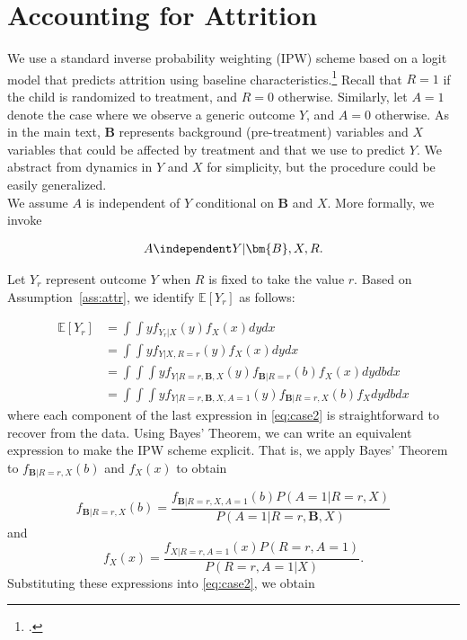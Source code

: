 \section{Accounting for Attrition} \label{appendix:attrition}

\noindent We use a standard inverse probability weighting (IPW) scheme based on a logit model that predicts attrition using baseline characteristics.\footnote{\citet{Horvitz_Thompson_1952_JASA}.} Recall that $R = 1$ if the child is randomized to treatment, and $R = 0$ otherwise. Similarly, let $A = 1$ denote the case where we observe a generic outcome $Y$, and $A = 0$ otherwise. As in the main text, $\bm{B}$ represents background (pre-treatment) variables and $X$ variables that could be affected by treatment and that we use to predict $Y$. We abstract from dynamics in $Y$ and $X$ for simplicity, but the procedure could be easily generalized.\\

\noindent We assume $A$ is independent of $Y$ conditional on $\bm{B}$ and $X$. More formally, we invoke


\begin{assumption} \label{ass:attr}
	\begin{align*}
		A \independent Y | \bm{B}, X, R.
	\end{align*}
\end{assumption}

\noindent Let $Y_{r}$ represent outcome $Y$ when $R$ is fixed to take the value $r$. Based on Assumption~\ref{ass:attr}, we identify $\mathbb{E}[Y_r]$ as follows:

\begin{align} \label{eq:case2}
\mathbb{E}[Y_r] & = \int \int y f_{Y_r|X}(y) f_X(x) dydx \\ \nonumber
	           & = \int \int y f_{Y|X,R=r}(y) f_X(x) dydx \\ \nonumber
				& = \int \int \int y f_{Y|R=r,\bm{B},X}(y) f_{\bm{B}|R=r}(b) f_X(x) dydbdx \\ \nonumber
				& = \int \int \int y f_{Y|R=r,\bm{B},X,A=1}(y) f_{\bm{B}|R=r,X}(b) f_X dydbdx
\end{align}
\noindent where each component of the last expression in \eqref{eq:case2} is straightforward to recover from the data. Using Bayes' Theorem, we can write an equivalent expression to make the IPW scheme explicit. That is, we apply Bayes' Theorem to $f_{\bm{B}|R=r,X}(b)$ and $f_X(x)$ to obtain

\begin{equation*}
f_{\bm{B}|R=r,X}(b) = \frac{f_{\bm{B}|R=r,X,A=1}(b) P(A=1|R=r,X)}{P(A=1|R=r,\bm{B},X)}
\end{equation*}
and
\begin{equation*}
	f_X(x) = \frac{f_{X|R=r,A=1}(x) P(R=r,A=1)}{P(R=r,A=1|X)}.
\end{equation*}
\noindent Substituting these expressions into \eqref{eq:case2}, we obtain

